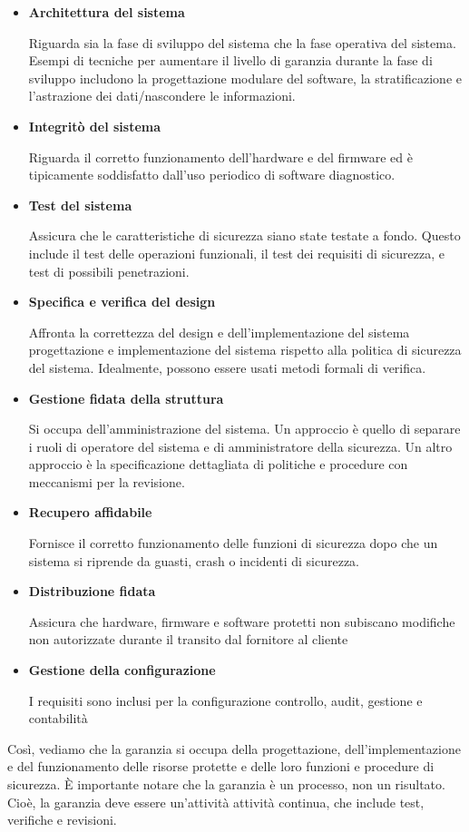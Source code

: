 \begin{itemize}
    \item \textbf{Architettura del sistema} 
    
    Riguarda sia la fase di sviluppo del sistema che la fase operativa del sistema. Esempi di tecniche per aumentare il livello di garanzia durante la fase di sviluppo includono la progettazione modulare del software, la stratificazione e l'astrazione dei dati/nascondere le informazioni.
    
    \item\textbf{Integritò del sistema}
    
    Riguarda il corretto funzionamento dell'hardware e del firmware ed è tipicamente soddisfatto dall'uso periodico di software diagnostico.
    
    \item \textbf{Test del sistema}
    
    Assicura che le caratteristiche di sicurezza siano state testate a fondo. Questo include il test delle operazioni funzionali, il test dei requisiti di sicurezza, e test di possibili penetrazioni.
    
    \item \textbf{Specifica e verifica del design}
    
    Affronta la correttezza del design e dell'implementazione del sistema progettazione e implementazione del sistema rispetto alla politica di sicurezza del sistema. Idealmente, possono essere usati metodi formali di verifica.
    
    \item \textbf{Gestione fidata della struttura}
    
    Si occupa dell'amministrazione del sistema. Un approccio è quello di separare i ruoli di operatore del sistema e di amministratore della sicurezza. Un altro approccio è la specificazione dettagliata di politiche e procedure con meccanismi per la revisione.
    
    \item \textbf{Recupero affidabile}
    
    Fornisce il corretto funzionamento delle funzioni di sicurezza dopo che un sistema si riprende da guasti, crash o incidenti di sicurezza.
    
    \item \textbf{Distribuzione fidata}
    
    Assicura che hardware, firmware e software protetti non subiscano modifiche non autorizzate durante il transito dal fornitore al cliente
     
    \item \textbf{Gestione della configurazione}
     
    I requisiti sono inclusi per la configurazione controllo, audit, gestione e contabilità
\end{itemize}
Così, vediamo che la garanzia si occupa della progettazione, dell'implementazione e del funzionamento delle risorse protette e delle loro funzioni e procedure di sicurezza. È importante notare che la garanzia è un processo, non un risultato. Cioè, la garanzia deve essere un'attività attività continua, che include test, verifiche e revisioni.
\newpage
